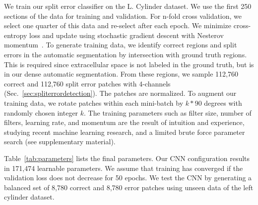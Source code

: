 We train our split error classifier on the L. Cylinder dataset. We use the first 250 sections of the data for training and validation. For n-fold cross validation, we select one quarter of this data and re-select after each epoch. We minimize cross-entropy loss and update using stochastic gradient descent with Nesterov momentum~\cite{nesterov}. To generate training data, we identify correct regions and split errors in the automatic segmentation by intersection with ground truth regions. This is required since extracellular space is not labeled in the ground truth, but is in our dense automatic segmentation. From these regions, we sample 112,760 correct and 112,760 split error patches with 4-channels (Sec.~\ref{sec:spliterrordetection}). The patches are normalized. To augment our training data, we rotate patches within each mini-batch by $k*90$ degrees with randomly chosen integer $k$. The training parameters such as filter size, number of filters, learning rate, and momentum are the result of intuition and experience, studying recent machine learning research, and a limited brute force parameter search (see supplementary material). 

Table~\ref{tab:parameters} lists the final parameters. Our CNN configuration results in 171,474 learnable parameters. We assume that training has converged if the validation loss does not decrease for 50 epochs. We test the CNN by generating a balanced set of 8,780 correct and 8,780 error patches using unseen data of the left cylinder dataset. 

